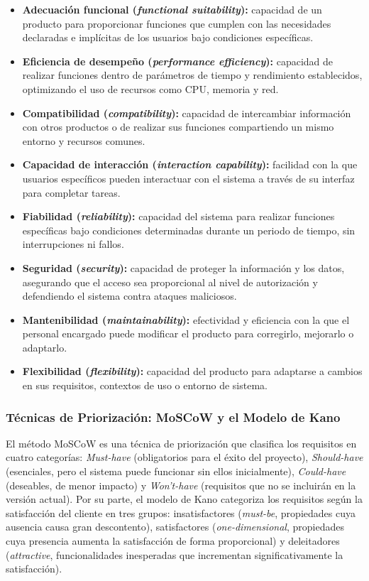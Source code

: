 \documentclass[journal,onecolumn]{IEEEtran}
\begin{document}
\begin{itemize}[leftmargin=*]
  \item \textbf{Adecuación funcional (\textit{functional suitability}):}
  capacidad de un producto para proporcionar funciones que cumplen con las
  necesidades declaradas e implícitas de los usuarios bajo condiciones
  específicas.
  \item \textbf{Eficiencia de desempeño (\textit{performance efficiency}):}
  capacidad de realizar funciones dentro de parámetros de tiempo y
  rendimiento establecidos, optimizando el uso de recursos como CPU,
  memoria y red.
  \item \textbf{Compatibilidad (\textit{compatibility}):} capacidad de
  intercambiar información con otros productos o de realizar sus funciones
  compartiendo un mismo entorno y recursos comunes.
  \item \textbf{Capacidad de interacción (\textit{interaction capability}):}
  facilidad con la que usuarios específicos pueden interactuar con el
  sistema a través de su interfaz para completar tareas.
  \item \textbf{Fiabilidad (\textit{reliability}):} capacidad del sistema
  para realizar funciones específicas bajo condiciones determinadas durante
  un periodo de tiempo, sin interrupciones ni fallos.
  \item \textbf{Seguridad (\textit{security}):} capacidad de proteger la
  información y los datos, asegurando que el acceso sea proporcional al
  nivel de autorización y defendiendo el sistema contra ataques maliciosos.
  \item \textbf{Mantenibilidad (\textit{maintainability}):} efectividad y
  eficiencia con la que el personal encargado puede modificar el producto
  para corregirlo, mejorarlo o adaptarlo.
  \item \textbf{Flexibilidad (\textit{flexibility}):} capacidad del producto
  para adaptarse a cambios en sus requisitos, contextos de uso o entorno de
  sistema.
\end{itemize}

\subsubsection{Técnicas de Priorización: MoSCoW y el Modelo de Kano}

El método MoSCoW \cite{moscow_kano} es una técnica de priorización que
clasifica los requisitos en cuatro categorías: \textit{Must-have}
(obligatorios para el éxito del proyecto), \textit{Should-have}
(esenciales, pero el sistema puede funcionar sin ellos inicialmente),
\textit{Could-have} (deseables, de menor impacto) y \textit{Won't-have}
(requisitos que no se incluirán en la versión actual). Por su parte, el
modelo de Kano \cite{moscow_kano} categoriza los requisitos según la
satisfacción del cliente en tres grupos: insatisfactores
(\textit{must-be}, propiedades cuya ausencia causa gran descontento),
satisfactores (\textit{one-dimensional}, propiedades cuya presencia
aumenta la satisfacción de forma proporcional) y deleitadores
(\textit{attractive}, funcionalidades inesperadas que incrementan
significativamente la satisfacción).
\end{document}
